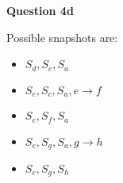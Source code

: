 \documentclass[11pt,a4paper]{report}
\begin{document}
\begin{multicols*}{2}
\noindent \textbf{Question 4d}

\noindent Possible snapshots are:

\begin{itemize}
  \item $S_d, S_c, S_a$
  \item $S_e, S_c, S_a,e\rightarrow f$
  \item $S_e, S_f, S_a$
  \item $S_e, S_g, S_a,g\rightarrow h$
  \item $S_e, S_g, S_h$
\end{itemize}

\end{multicols*}
\end{document}
